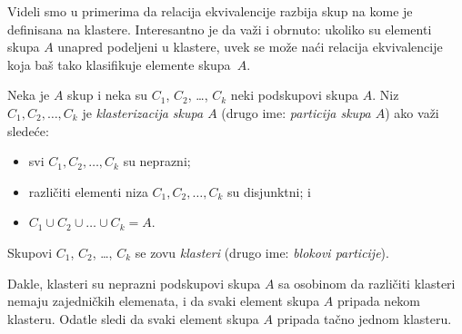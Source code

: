 Videli smo u primerima da relacija ekvivalencije razbija skup na kome je definisana na klastere.
Interesantno je da va\v zi i obrnuto: ukoliko su elementi skupa $A$ unapred podeljeni u klastere,
uvek se mo\v ze na\'ci relacija ekvivalencije koja ba\v s tako klasifikuje elemente skupa~$A$.

\begin{DEF}
  Neka je $A$ skup i neka su $C_1$, $C_2$, \ldots, $C_k$ neki podskupovi skupa $A$.
  Niz $C_1, C_2, \ldots, C_k$ je \emph{klasterizacija skupa $A$} (drugo ime: \emph{particija skupa $A$})
  ako va\v zi slede\'ce:
\end{DEF}

\noindent
\begin{minipage}{3in}
  \begin{itemize}\itemsep -1.5pt
  \item svi $C_1, C_2, \ldots, C_k$ su neprazni;
  \item razli\v citi elementi niza $C_1, C_2, \ldots, C_k$ su disjunktni; i
  \item $C_1 \cup C_2 \cup \ldots \cup C_k = A$.
  \end{itemize}

  \kern -4mm

  Skupovi $C_1$, $C_2$, \ldots, $C_k$ se zovu \emph{klasteri} (drugo ime: \emph{blokovi particije}).

  \medskip

  \hspace*{1.5em}Dakle, klasteri su neprazni podskupovi skupa $A$ sa osobinom da razli\v citi klasteri nemaju zajedni\v ckih
  elemenata, i da svaki element skupa $A$ pripada nekom klasteru. Odatle sledi da svaki element skupa $A$ pripada
  ta\v cno jednom klasteru.
\end{minipage}
\hfill
\begin{minipage}{2.5in}
  \begin{center}
    
  \end{center}
\end{minipage}

